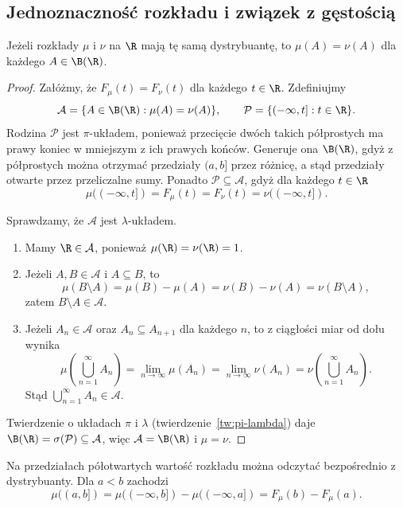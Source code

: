 
\subsection{Jednoznaczność rozkładu i związek z gęstością}

\begin{twierdzenie}
\label{tw:dystrybuanta-wyznacza-rozklad}
Jeżeli rozkłady $\mu$ i $\nu$ na $\R$ mają tę samą dystrybuantę,
to $\mu(A)=\nu(A)$ dla każdego $A\in\B(\R)$.
\end{twierdzenie}

\begin{proof}
Załóżmy, że $F_\mu(t)=F_\nu(t)$ dla każdego $t\in\R$. Zdefiniujmy
\[
  \mathcal A=\{A\in\B(\R):\mu(A)=\nu(A)\},\qquad
  \mathcal P=\{(-\infty,t]:t\in\R\}.
\]
Rodzina $\mathcal P$ jest $\pi$-układem, ponieważ przecięcie dwóch
takich półprostych ma prawy koniec w mniejszym z ich prawych końców.
Generuje ona $\B(\R)$, gdyż z półprostych można otrzymać przedziały
$(a,b]$ przez różnicę, a stąd przedziały otwarte przez przeliczalne sumy.
Ponadto $\mathcal P\subseteq\mathcal A$, gdyż dla każdego $t\in\R$
\[
  \mu((-\infty,t])=F_\mu(t)=F_\nu(t)=\nu((-\infty,t]).
\]

Sprawdzamy, że $\mathcal A$ jest $\lambda$-układem.
\begin{enumerate}
  \item Mamy $\R\in\mathcal A$, ponieważ $\mu(\R)=\nu(\R)=1$.
  \item Jeżeli $A,B\in\mathcal A$ i $A\subseteq B$, to
    \[
      \mu(B\setminus A)=\mu(B)-\mu(A)=\nu(B)-\nu(A)=\nu(B\setminus A),
    \]
    zatem $B\setminus A\in\mathcal A$.
  \item Jeżeli $A_n\in\mathcal A$ oraz $A_n\subseteq A_{n+1}$
    dla każdego $n$, to z ciągłości miar od dołu wynika
    \[
      \mu\!\left(\bigcup_{n=1}^\infty A_n\right)
      =\lim_{n\to\infty}\mu(A_n)
      =\lim_{n\to\infty}\nu(A_n)
      =\nu\!\left(\bigcup_{n=1}^\infty A_n\right).
    \]
    Stąd $\bigcup_{n=1}^\infty A_n\in\mathcal A$.
\end{enumerate}
Twierdzenie o układach $\pi$ i $\lambda$ (twierdzenie~\ref{tw:pi-lambda})
daje $\B(\R)=\sigma(\mathcal P)\subseteq\mathcal A$,
więc $\mathcal A=\B(\R)$ i $\mu=\nu$.
\end{proof}

Na przedziałach półotwartych wartość rozkładu można odczytać bezpośrednio
z dystrybuanty. Dla $a<b$ zachodzi
\[
  \mu((a,b])=\mu((-\infty,b])-\mu((-\infty,a])=F_\mu(b)-F_\mu(a).
\]

